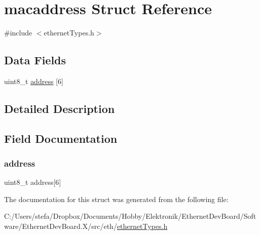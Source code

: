 \hypertarget{structmacaddress}{}\section{macaddress Struct Reference}
\label{structmacaddress}


{\ttfamily \#include $<$ethernet\+Types.\+h$>$}

\subsection*{Data Fields}
\begin{DoxyCompactItemize}
\item 
uint8\+\_\+t \mbox{\hyperlink{structmacaddress_a3859a5a24fa98fcde6ab0e29800d2318}{address}} \mbox{[}6\mbox{]}
\end{DoxyCompactItemize}


\subsection{Detailed Description}


\subsection{Field Documentation}
\mbox{\label{structmacaddress_a3859a5a24fa98fcde6ab0e29800d2318}} 
\subsubsection{\texorpdfstring{address}{address}}
{\footnotesize\ttfamily uint8\+\_\+t address\mbox{[}6\mbox{]}}



The documentation for this struct was generated from the following file\+:\begin{DoxyCompactItemize}
\item 
C\+:/\+Users/stefa/\+Dropbox/\+Documents/\+Hobby/\+Elektronik/\+Ethernet\+Dev\+Board/\+Software/\+Ethernet\+Dev\+Board.\+X/src/eth/\mbox{\hyperlink{ethernet_types_8h}{ethernet\+Types.\+h}}\end{DoxyCompactItemize}
